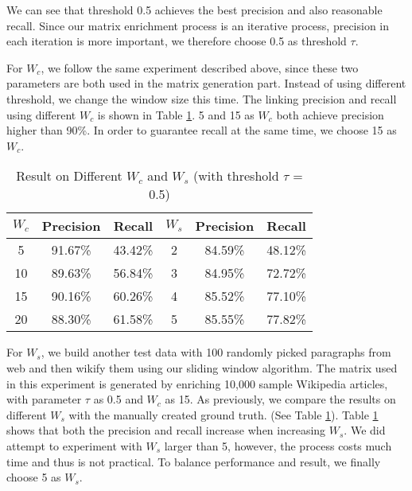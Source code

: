 We can see that threshold 0.5 achieves the best precision and also
reasonable recall. Since our matrix enrichment process is an
iterative process, precision in each iteration is more important, we
therefore choose 0.5 as threshold $\tau$.

For $W_c$, we follow the same experiment described above,
since these two parameters are both used in the matrix generation part.
Instead of using different threshold, we change the window size this
time. The linking precision and recall using different $W_c$ is shown
in Table \ref{tab:window}. 5 and 15 as $W_c$ both achieve precision
higher than 90\%. In order to guarantee recall at the same time, we
choose 15 as $W_c$.

\begin{table}[th]
\centering
\begin{tabular}{|c|c|c||c|c|c|}
\hline
$W_c$ & Precision & Recall & $W_s$ & Precision & Recall \\
\hline \hline
5 & 91.67\% & 43.42\% & 2 &84.59\%&	48.12\% \\
10 & 89.63\% & 56.84\% & 3 &84.95\%& 72.72\% \\
15 & 90.16\% & 60.26\% & 4 &85.52\%& 77.10\% \\
20 & 88.30\% & 61.58\% & 5 &85.55\%& 77.82\% \\
\hline
\end{tabular}
\caption{Result on Different $W_c$ and $W_s$ (with threshold $\tau$ = 0.5)}
\label{tab:window}
\end{table}

For $W_s$, we build another test data with 100 randomly picked paragraphs
from web and then wikify them using our sliding window algorithm. The matrix used in
this experiment is generated by enriching 10,000 sample Wikipedia articles, with parameter
$\tau$ as 0.5 and $W_c$ as 15.  As previously,
we compare the results on different $W_s$ with the manually created ground truth.
(See Table \ref{tab:window}). Table \ref{tab:window} shows that both the
precision and recall increase when increasing $W_s$. We did attempt to experiment
with $W_s$ larger than 5,
however, the process costs much time and thus is not practical. To balance
performance and result, we finally choose 5 as $W_s$.

